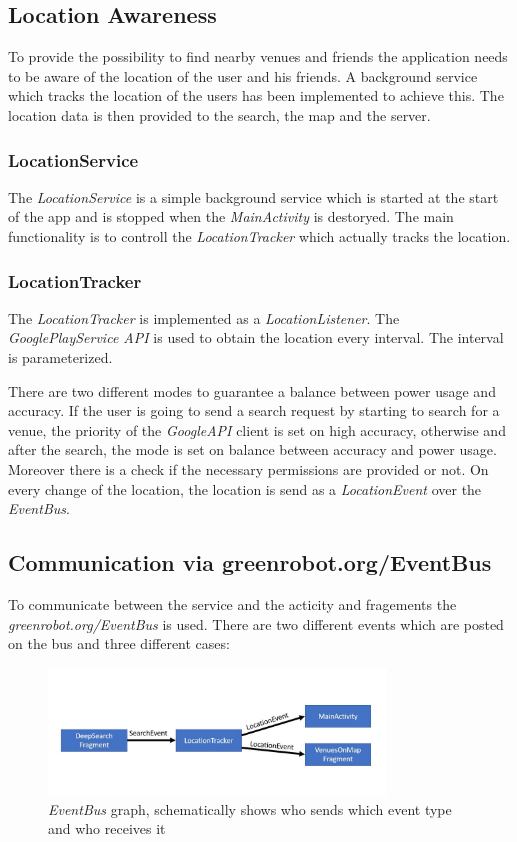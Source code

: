 \subsection{Location Awareness}

To provide the possibility to find nearby venues and friends the application needs to be aware of the location of the user and his friends. A background service which tracks the location of the users has been implemented to achieve this. The location data is then provided to the search, the map and the server.

\subsubsection{LocationService}
The \textit{LocationService} is a simple background service which is started at the start of the app and is stopped when the \textit{MainActivity} is destoryed. The main functionality is to controll the \textit{LocationTracker} which actually tracks the location.

\subsubsection{LocationTracker}
The \textit{LocationTracker} is implemented as a \textit{LocationListener}. The \textit{GooglePlayService API} is used to obtain the location every interval. The interval is parameterized.

There are two different modes to guarantee a balance between power usage and accuracy. If the user is going to send a search request by starting to search for a venue, the priority of the \textit{GoogleAPI} client is set on high accuracy, otherwise and after the search, the mode is set on balance between accuracy and power usage. Moreover there is a check if the necessary permissions are provided or not. On every change of the location, the location is send as a \textit{LocationEvent} over the \textit{EventBus}. 

\subsection{Communication via greenrobot.org/EventBus}

To communicate between the service and the acticity and fragements the \textit{greenrobot.org/EventBus} is used. There are two different events which are posted on the bus and three different cases:


\begin{figure}[htbp]
	\includegraphics[width=0.8\textwidth]{images/eventBus.jpg}
	\centering
	\caption[]{\textit{EventBus} graph, schematically shows who sends which event type and who receives it}
	\label{fig:eventbus}
\end{figure} 


